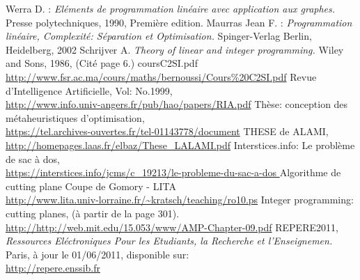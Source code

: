 \documentclass[a4paper,11pt,oneside]{report}
\theoremstyle{plain}
\newcommand{\0}{/ \! \! \! 0}
\theoremstyle{plain}
\begin{document}
\begin{thebibliography}{10}
Werra D. :
\emph{El\'ements de programmation lin\'eaire avec application aux graphes.}
Presse polytechniques, 1990, Premi\`ere edition.
Maurras Jean F. :
\emph{Programmation lin\'eaire, Complexit\'e: S\'eparation et Optimisation.}
Spinger-Verlag Berlin, Heidelberg, 2002
Schrijver A. \label{Schrijver}
\emph{Theory of linear and integer programming.}
Wiley and Sons, 1986, (Cit\'e page 6.)
coursC2SI.pdf \\
\url{http://www.fsr.ac.ma/cours/maths/bernoussi/Cours\%20C2SI.pdf}
Revue d'Intelligence Artificielle, Vol: No.1999,\\
\url{http://www.info.univ-angers.fr/pub/hao/papers/RIA.pdf}
Th\`ese: conception des m\'etaheuristiques d'optimisation,\\
\url{https://tel.archives-ouvertes.fr/tel-01143778/document}
THESE de ALAMI,\\
\url{http://homepages.laas.fr/elbaz/These_LALAMI.pdf}
Interstices.info: Le probl\`eme de sac \`a dos,\\
\url{https://interstices.info/jcms/c_19213/le-probleme-du-sac-a-dos }
Algorithme de cutting plane Coupe de Gomory - LITA\\
\url{http://www.lita.univ-lorraine.fr/~kratsch/teaching/ro10.ps}
Integer programming: cutting planes, (\`a partir de la page 301).\\
\url{http://http://web.mit.edu/15.053/www/AMP-Chapter-09.pdf}
REPERE2011,\\
\emph{Ressources El\'ectroniques Pour les Etudiants, la Recherche et l'Enseignemen.}\\
Paris, \`a jour le 01/06/2011, disponible sur:\\
\url{http://repere.enssib.fr}

\end{thebibliography}
\end{document}
